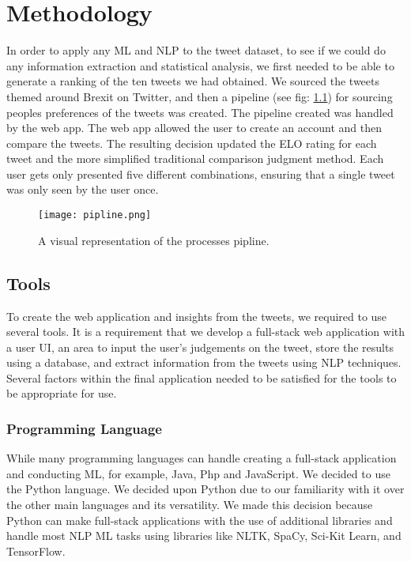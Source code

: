 \chapter{Methodology}
	\label{chap:typesetting}
	In order to apply any ML and NLP to the tweet dataset, to see if we could do any information extraction and statistical analysis, we first needed to be able to generate a ranking of the ten tweets we had obtained. We sourced the tweets themed around Brexit on Twitter, and then a pipeline (see fig: \ref{fig:pipeline}) for sourcing peoples preferences of the tweets was created. The pipeline created was handled by the web app. The web app allowed the user to create an account and then compare the tweets. The resulting decision updated the ELO rating for each tweet and the more simplified traditional comparison judgment method. Each user gets only presented five different combinations, ensuring that a single tweet was only seen by the user once.
	
	\begin{figure}[t]
		\texttt{[image: pipline.png]}
		\caption{A visual representation of the processes pipline.}
		\label{fig:pipeline}
		
	\end{figure}
	
	\section{Tools}
	To create the web application and insights from the tweets, we required to use several tools. It is a requirement that we develop a full-stack web application with a user UI, an area to input the user's judgements on the tweet, store the results using a database, and extract information from the tweets using NLP techniques. Several factors within the final application needed to be satisfied for the tools to be appropriate for use.
	
	
	\subsection{Programming Language}
	While many programming languages can handle creating a full-stack application and conducting ML, for example, Java, Php and JavaScript. We decided to use the Python language. We decided upon Python due to our familiarity with it over the other main languages and its versatility. We made this decision because Python can make full-stack applications with the use of additional libraries and handle most NLP ML tasks using libraries like NLTK, SpaCy, Sci-Kit Learn, and TensorFlow.
	
